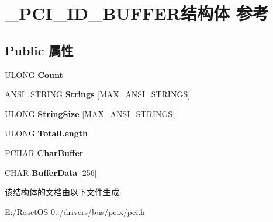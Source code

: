 \hypertarget{struct___p_c_i___i_d___b_u_f_f_e_r}{}\section{\+\_\+\+P\+C\+I\+\_\+\+I\+D\+\_\+\+B\+U\+F\+F\+E\+R结构体 参考}
\label{struct___p_c_i___i_d___b_u_f_f_e_r}
\subsection*{Public 属性}
\begin{DoxyCompactItemize}
\item 
\mbox{\label{struct___p_c_i___i_d___b_u_f_f_e_r_a0e966de8ea412512a092a518c9d9040e}} 
U\+L\+O\+NG {\bfseries Count}
\item 
\mbox{\label{struct___p_c_i___i_d___b_u_f_f_e_r_aa13e7e4fdbd0c2d569365ee28e8d7758}} 
\hyperlink{struct___a_n_s_i___s_t_r_i_n_g}{A\+N\+S\+I\+\_\+\+S\+T\+R\+I\+NG} {\bfseries Strings} \mbox{[}M\+A\+X\+\_\+\+A\+N\+S\+I\+\_\+\+S\+T\+R\+I\+N\+GS\mbox{]}
\item 
\mbox{\label{struct___p_c_i___i_d___b_u_f_f_e_r_a453a25f4902190c8fe6e95aaf676929d}} 
U\+L\+O\+NG {\bfseries String\+Size} \mbox{[}M\+A\+X\+\_\+\+A\+N\+S\+I\+\_\+\+S\+T\+R\+I\+N\+GS\mbox{]}
\item 
\mbox{\label{struct___p_c_i___i_d___b_u_f_f_e_r_aac4a23381bad0a467fee93796e33637b}} 
U\+L\+O\+NG {\bfseries Total\+Length}
\item 
\mbox{\label{struct___p_c_i___i_d___b_u_f_f_e_r_ac01ab7e89a7abcf035c73369350ad3d6}} 
P\+C\+H\+AR {\bfseries Char\+Buffer}
\item 
\mbox{\label{struct___p_c_i___i_d___b_u_f_f_e_r_a79a8cc18f546303b4b0d0f15d8843ff8}} 
C\+H\+AR {\bfseries Buffer\+Data} \mbox{[}256\mbox{]}
\end{DoxyCompactItemize}


该结构体的文档由以下文件生成\+:\begin{DoxyCompactItemize}
\item 
E\+:/\+React\+O\+S-\/0../drivers/bus/pcix/pci.\+h\end{DoxyCompactItemize}

